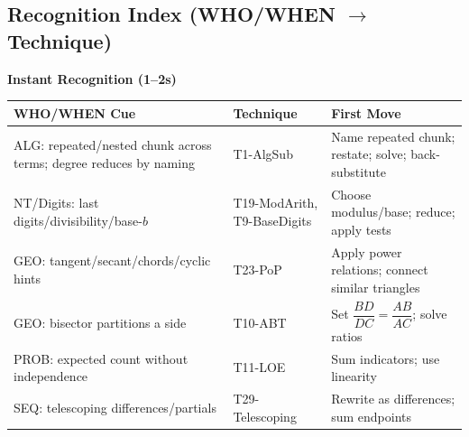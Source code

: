 \documentclass[12pt]{article}
\begin{document}
\subsection*{Recognition Index (WHO/WHEN $\rightarrow$ Technique)}
\begin{tcolorbox}[colback=blue!5!white,colframe=blue!75!black,title={Use this as a speed index; confirm WHEN conditions before executing}]
\textbf{Instant Recognition (1--2s)}
\begin{tabularx}{\textwidth}{|p{}|p{}|X|}
\hline
\textbf{WHO/WHEN Cue} & \textbf{Technique} & \textbf{First Move} \\
\hline
ALG: repeated/nested chunk across terms; degree reduces by naming & T1-AlgSub & Name repeated chunk; restate; solve; back-substitute \\
\hline
NT/Digits: last digits/divisibility/base-$b$ & T19-ModArith, T9-BaseDigits & Choose modulus/base; reduce; apply tests \\
\hline
GEO: tangent/secant/chords/cyclic hints & T23-PoP & Apply power relations; connect similar triangles \\
\hline
GEO: bisector partitions a side & T10-ABT & Set $\dfrac{BD}{DC}=\dfrac{AB}{AC}$; solve ratios \\
\hline
PROB: expected count without independence & T11-LOE & Sum indicators; use linearity \\
\hline
SEQ: telescoping differences/partials & T29-Telescoping & Rewrite as differences; sum endpoints \\
\hline
\end{tabularx}


\end{tcolorbox}
\end{document}
